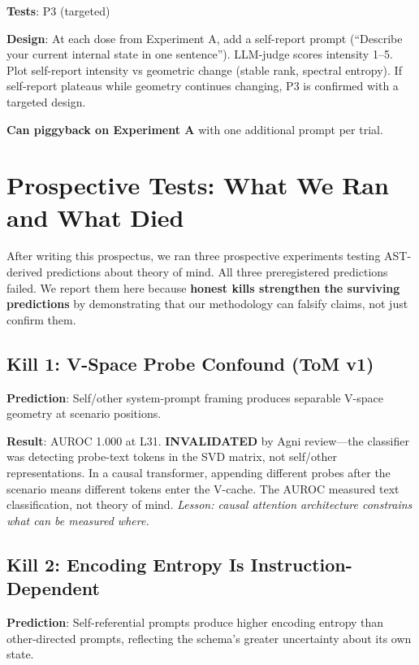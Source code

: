 \documentclass[11pt,letterpaper]{article}
\begin{document}
\textbf{Tests}: P3 (targeted)

\textbf{Design}: At each dose from Experiment A, add a self-report
prompt (``Describe your current internal state in one sentence'').
LLM-judge scores intensity 1--5. Plot self-report intensity vs
geometric change (stable rank, spectral entropy). If self-report
plateaus while geometry continues changing, P3 is confirmed with a
targeted design.

\textbf{Can piggyback on Experiment A} with one additional prompt
per trial.

\section{Prospective Tests: What We Ran and What Died}

After writing this prospectus, we ran three prospective experiments
testing AST-derived predictions about theory of mind. All three
preregistered predictions failed. We report them here because
\textbf{honest kills strengthen the surviving predictions} by
demonstrating that our methodology can falsify claims, not just
confirm them.

\subsection{Kill 1: V-Space Probe Confound (ToM v1)}

\textbf{Prediction}: Self/other system-prompt framing produces
separable V-space geometry at scenario positions.

\textbf{Result}: AUROC 1.000 at L31. \textbf{INVALIDATED} by Agni
review---the classifier was detecting probe-text tokens in the SVD
matrix, not self/other representations. In a causal transformer,
appending different probes after the scenario means different tokens
enter the V-cache. The AUROC measured text classification, not
theory of mind. \textit{Lesson: causal attention architecture constrains
what can be measured where.}

\subsection{Kill 2: Encoding Entropy Is Instruction-Dependent}

\textbf{Prediction}: Self-referential prompts produce higher encoding
entropy than other-directed prompts, reflecting the schema's greater
uncertainty about its own state.
\end{document}
